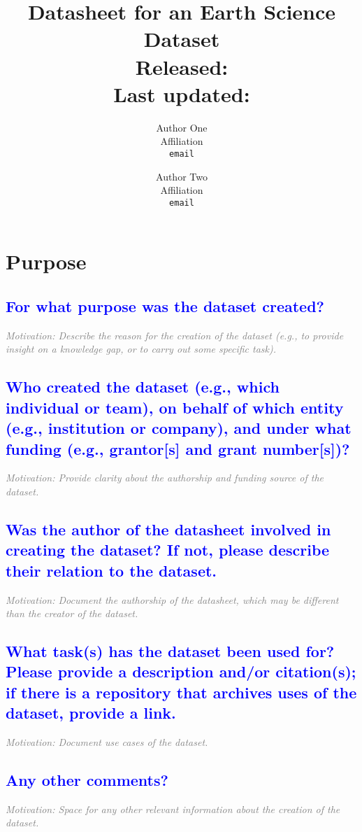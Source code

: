 \documentclass[letterpaper, 10 pt, transmag]{IEEEtran}
\title{
\LARGE \textbf{Datasheet for an Earth Science Dataset}
\\ \normalsize Released: %
\\ \footnotesize Last updated: %
}
\author{ Author One \\
	Affiliation \\
	\texttt{email} \\
	\and
	Author Two \\
	Affiliation \\
	\texttt{email} \\
}
\begin{document}
\maketitle
\thispagestyle{fancy}
\pagestyle{fancy}
\section{Purpose}

\textcolor{blue}{\subsection{For what purpose was the dataset created?}}
\textcolor{gray}{\textit{Motivation: Describe the reason for the creation of the dataset (e.g., to provide insight on a knowledge gap, or to carry out some specific task).}}

\textcolor{blue}{\subsection{Who created the dataset (e.g., which individual or team), on behalf of which entity (e.g., institution or company), and under what funding (e.g., grantor[s] and grant number[s])?}}
\textcolor{gray}{\textit{Motivation: Provide clarity about the authorship and funding source of the dataset.}}

\textcolor{blue}{\subsection{Was the author of the datasheet involved in creating the dataset? If not, please describe their relation to the dataset.}}
\textcolor{gray}{\textit{Motivation: Document the authorship of the datasheet, which may be different than the creator of the dataset.}}

\textcolor{blue}{\subsection{What task(s) has the dataset been used for? Please provide a description and/or citation(s); if there is a repository that archives uses of the dataset, provide a link.}}
\textcolor{gray}{\textit{Motivation: Document use cases of the dataset.}}

\textcolor{blue}{\subsection{Any other comments?}}
\textcolor{gray}{\textit{Motivation: Space for any other relevant information about the creation of the dataset.}}  
\end{document}
